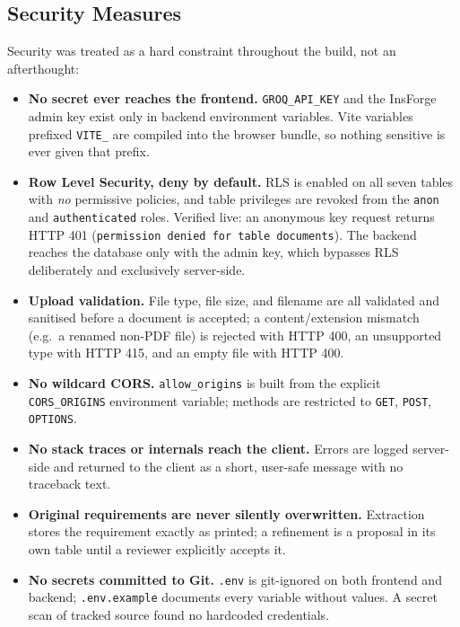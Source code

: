 \documentclass[11pt,a4paper]{article}
\begin{document}
\subsection{Security Measures}

Security was treated as a hard constraint throughout the build, not an
afterthought:

\begin{itemize}[leftmargin=1.4em]
  \item \textbf{No secret ever reaches the frontend.} \texttt{GROQ\_API\_KEY}
        and the InsForge admin key exist only in backend environment
        variables. Vite variables prefixed \texttt{VITE\_} are compiled into
        the browser bundle, so nothing sensitive is ever given that prefix.
  \item \textbf{Row Level Security, deny by default.} RLS is enabled on all
        seven tables with \emph{no} permissive policies, and table
        privileges are revoked from the \texttt{anon} and
        \texttt{authenticated} roles. Verified live: an anonymous key
        request returns HTTP 401 (\texttt{permission denied for table
        documents}). The backend reaches the database only with the admin
        key, which bypasses RLS deliberately and exclusively server-side.
  \item \textbf{Upload validation.} File type, file size, and filename are
        all validated and sanitised before a document is accepted; a
        content/extension mismatch (e.g.\ a renamed non-PDF file) is
        rejected with HTTP 400, an unsupported type with HTTP 415, and an
        empty file with HTTP 400.
  \item \textbf{No wildcard CORS.} \texttt{allow\_origins} is built from the
        explicit \texttt{CORS\_ORIGINS} environment variable; methods are
        restricted to \texttt{GET}, \texttt{POST}, \texttt{OPTIONS}.
  \item \textbf{No stack traces or internals reach the client.} Errors are
        logged server-side and returned to the client as a short,
        user-safe message with no traceback text.
  \item \textbf{Original requirements are never silently overwritten.}
        Extraction stores the requirement exactly as printed; a refinement
        is a proposal in its own table until a reviewer explicitly accepts
        it.
  \item \textbf{No secrets committed to Git.} \texttt{.env} is git-ignored
        on both frontend and backend; \texttt{.env.example} documents every
        variable without values. A secret scan of tracked source found no
        hardcoded credentials.
\end{itemize}
\end{document}
